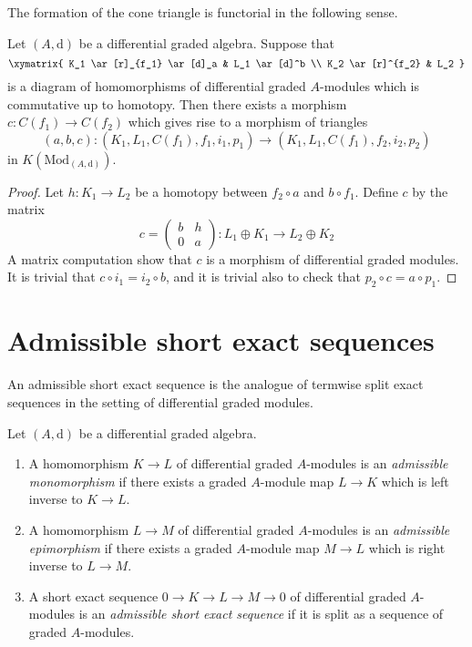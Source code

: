 \noindent
The formation of the cone triangle is functorial in the following sense.

\begin{lemma}
\label{lemma-functorial-cone}
Let $(A, \text{d})$ be a differential graded algebra.
Suppose that
$$
\xymatrix{
K_1 \ar[r]_{f_1} \ar[d]_a & L_1 \ar[d]^b \\
K_2 \ar[r]^{f_2} & L_2
}
$$
is a diagram of homomorphisms of differential graded $A$-modules which is
commutative up to homotopy.
Then there exists a morphism $c : C(f_1) \to C(f_2)$ which gives rise to
a morphism of triangles
$$
(a, b, c) : (K_1, L_1, C(f_1), f_1, i_1, p_1) \to
(K_1, L_1, C(f_1), f_2, i_2, p_2)
$$
in $K(\text{Mod}_{(A, \text{d})})$.
\end{lemma}

\begin{proof}
Let $h : K_1 \to L_2$ be a homotopy between $f_2 \circ a$ and $b \circ f_1$.
Define $c$ by the matrix
$$
c =
\left(
\begin{matrix}
b & h \\
0 & a
\end{matrix}
\right) :
L_1 \oplus K_1 \to L_2 \oplus K_2
$$
A matrix computation show that $c$ is a morphism of differential
graded modules. It is trivial that $c \circ i_1 = i_2 \circ b$, and it is
trivial also to check that $p_2 \circ c = a \circ p_1$.
\end{proof}











\section{Admissible short exact sequences}
\label{section-admissible}

\noindent
An admissible short exact sequence is the analogue of termwise split exact
sequences in the setting of differential graded modules.

\begin{definition}
\label{definition-admissible-ses}
Let $(A, \text{d})$ be a differential graded algebra.
\begin{enumerate}
\item A homomorphism $K \to L$ of differential graded $A$-modules
is an {\it admissible monomorphism} if there exists a graded $A$-module
map $L \to K$ which is left inverse to $K \to L$.
\item A homomorphism $L \to M$ of differential graded $A$-modules
is an {\it admissible epimorphism} if there exists a graded $A$-module
map $M \to L$ which is right inverse to $L \to M$.
\item A short exact sequence $0 \to K \to L \to M \to 0$ of differential
graded $A$-modules is an {\it admissible short exact sequence}
if it is split as a sequence of graded $A$-modules.
\end{enumerate}
\end{definition}

